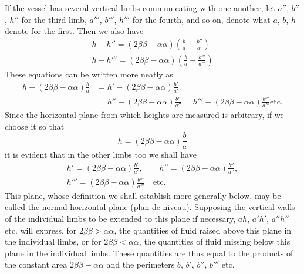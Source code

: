 If the vessel has several vertical limbs communicating with one another, let $a''$, $b''$, $h''$ for the third limb, $a'''$, $b'''$, $h'''$ for the fourth, and so on, denote what $a$, $b$, $h$ denote for the first. Then we also have
\[
\begin{gathered}
h-h''=(2\beta\beta-\alpha\alpha)(\frac{b}{a}-\frac{b''}{a'})\\
h-h'''=(2\beta\beta-\alpha\alpha)(\frac{b}{a}-\frac{b'''}{a'''})
\end{gathered}
\]
These equations can be written more neatly as
\[
\begin{aligned}
h-(2\beta\beta-\alpha\alpha)\frac{b}{a}&=h'-(2\beta\beta-\alpha\alpha)\frac{b'}{a'}\\
&=h''-(2\beta\beta-\alpha\alpha)\frac{b''}{a''}=h'''-(2\beta\beta-\alpha\alpha)\frac{b'''}{a'''}\text{etc.}
\end{aligned}
\]
Since the horizontal plane from which heights are measured is arbitrary, if we choose it so that
\[
h=(2\beta\beta-\alpha\alpha)\frac{b}{a}
\]
it is evident that in the other limbs too we shall have
\[
\begin{gathered}
h'=(2\beta\beta-\alpha\alpha)\frac{b'}{a'},\qquad h''=(2\beta\beta-\alpha\alpha)\frac{b''}{a''},\\
h'''=(2\beta\beta-\alpha\alpha)\frac{b'''}{a'''}\quad\text{etc.}
\end{gathered}
\]
This plane, whose definition we shall establish more generally below, may be called the normal horizontal plane (plan de niveau). Supposing the vertical walls of the individual limbs to be extended to this plane if necessary, $ah$, $a'h'$, $a''h''$ etc. will express, for $2\beta\beta>\alpha\alpha$, the quantities of fluid raised above this plane in the individual limbs, or for $2\beta\beta<\alpha\alpha$, the quantities of fluid missing below this plane in the individual limbs. These quantities are thus equal to the products of the constant area $2\beta\beta-\alpha\alpha$ and the perimeters $b$, $b'$, $b''$, $b'''$ etc.

